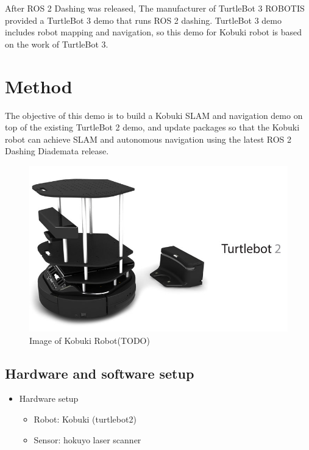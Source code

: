 \documentclass[letterpaper, 10 pt, conference]{ieeeconf}  %
\begin{document}
After ROS 2 Dashing was released, The manufacturer of TurtleBot 3 ROBOTIS\cite{c5} provided a TurtleBot 3 demo that runs ROS 2 dashing. TurtleBot 3 demo includes robot mapping and navigation, so this demo for Kobuki robot is based on the work of TurtleBot 3. 
\section{Method}
The objective of this demo is to build a Kobuki SLAM and navigation demo on top of the existing TurtleBot 2 demo, and update packages so that the Kobuki robot can achieve SLAM and autonomous navigation using the latest ROS 2 Dashing Diademata release. 
 
\begin{figure}[ht]
  \includegraphics[width=\linewidth]{kobuki_image.jpg}
  \caption{Image of Kobuki Robot(TODO)} 
  \label{fig:Kobuki_image}
\end{figure}
\subsection{Hardware and software setup}
\begin{itemize}
\item  Hardware setup 
    \begin{itemize}
        \item Robot: Kobuki (turtlebot2)
        \item Sensor: hokuyo laser scanner
    \end{itemize}{}
\end{itemize}
\end{document}
